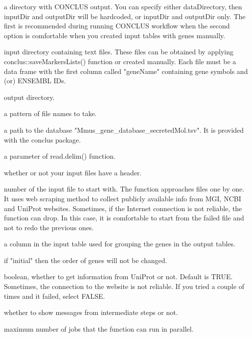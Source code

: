 \documentclass[a4paper]{book}
\begin{document}
\begin{Arguments}
\begin{ldescription}
\item[\code{dataDirectory}] a directory with CONCLUS output. You can specify either 
dataDirectory, then inputDir and outputDir will be hardcoded, or inputDir and outputDir only.
The first is recommended during running CONCLUS workflow when the second option
is comfortable when you created input tables with genes manually.

\item[\code{inputDir}] input directory containing text files. These files can be obtained by 
applying conclus::saveMarkersLists() function or created manually. Each file must be a 
data frame with the first column called "geneName" containing gene symbols and (or) ENSEMBL IDs.

\item[\code{outputDir}] output directory.

\item[\code{pattern}] a pattern of file names to take.

\item[\code{databaseDir}] a path to the database "Mmus\_gene\_database\_secretedMol.tsv". It is provided with the conclus package.

\item[\code{sep}] a parameter of read.delim() function.

\item[\code{header}] whether or not your input files have a header.

\item[\code{startFromFile}] number of the input file to start with. The function approaches files one by one.
It uses web scraping method to collect publicly available info from MGI, NCBI and UniProt websites.
Sometimes, if the Internet connection is not reliable, the function can drop. 
In this case, it is comfortable to start from the failed file and not to redo the previous ones.

\item[\code{groupBy}] a column in the input table used for grouping the genes in the output tables.

\item[\code{orderGenes}] if "initial" then the order of genes will not be changed.

\item[\code{getUniprot}] boolean, whether to get information from UniProt or not. Default is TRUE.
Sometimes, the connection to the website is not reliable. 
If you tried a couple of times and it failed, select FALSE.

\item[\code{silent}] whether to show messages from intermediate steps or not.

\item[\code{coresGenes}] maximum number of jobs that the function can run in parallel.
\end{ldescription}
\end{Arguments}
\end{document}
